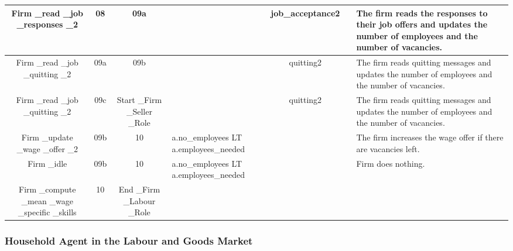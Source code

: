 \begin{landscape}
\begin{table}[!htb]
\begin{center}
\begin{tabular}{|c|c|c|l|c|c|l|}
\hline {\parbox[l]{3cm}{Firm \_read \_job \_responses \_2}}&
{\parbox[l]{3cm}{08}}& {\parbox[l]{3cm}{09a}}& &
{\parbox[l]{3cm}{job\_acceptance2}} & & {\parbox[l]{3cm}{The firm
reads the responses to their job offers and updates the number of
employees and the number of vacancies.}}
\\

\hline {\parbox[l]{3cm}{Firm \_read \_job \_quitting \_2}}&
{\parbox[l]{3cm}{09a}}&
{\parbox[l]{3cm}{09b}}&&{\parbox[l]{3cm}{quitting2}}
 & & {\parbox[l]{3cm}{The firm reads quitting messages and updates the number
of employees and the number of vacancies.}}
\\
\hline {\parbox[l]{3cm}{Firm \_read \_job \_quitting \_2}}&
{\parbox[l]{3cm}{09c}}& {\parbox[l]{3cm}{Start \_Firm \_Seller
\_Role}}&& {\parbox[l]{3cm}{quitting2}}
 & & {\parbox[l]{3cm}{The firm reads quitting messages and updates the number
of employees and the number of vacancies.}}
\\

\hline {\parbox[l]{3cm}{Firm \_update \_wage \_offer \_2}}&
{\parbox[l]{3cm}{09b}}&
{\parbox[l]{3cm}{10}}&{\parbox[l]{3cm}{a.no\_employees LT
a.employees\_needed}}
 & & &{\parbox[l]{3cm}{The
firm increases the wage offer if there are vacancies left.}}
\\

\hline {\parbox[l]{3cm}{Firm \_idle}}& {\parbox[l]{3cm}{09b}}&
{\parbox[l]{3cm}{10}}&{\parbox[l]{3cm}{a.no\_employees LT
a.employees\_needed}}
 & & &{\parbox[l]{3cm}{Firm does
nothing.}}
\\

\hline {\parbox[l]{3cm}{Firm \_compute \_mean \_wage \_specific
\_skills}}& {\parbox[l]{3cm}{10}}& {\parbox[l]{3cm}{End \_Firm
\_Labour \_Role}}&
 & & &
\\
\hline


\end{tabular}\end{center}\label{tab:labourfirm}
\end{table}
\end{landscape}



\subsubsection{Household Agent in the Labour and Goods Market}

